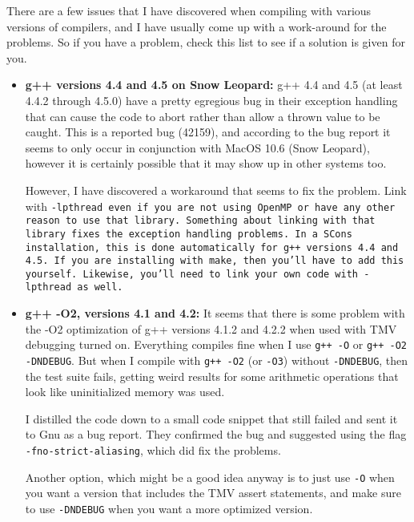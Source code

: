 There are a few issues that I have discovered when compiling with various 
versions of compilers, and I have usually come up with a work-around for
the problems.  So if you have a problem, check this list to see if a solution
is given for you.  

\begin{itemize}
\item {\bf g++ versions 4.4 and 4.5 on Snow Leopard:}
g++ 4.4 and 4.5 (at least 4.4.2 through 4.5.0) have a pretty egregious bug in their exception handling that 
can cause the code to abort rather than allow a thrown value to be caught.  
This is a reported bug (42159), and according to the bug report it seems to only occur in
conjunction with MacOS 10.6 (Snow Leopard), however it is certainly possible that it 
may show up in other systems too. 

However, I have discovered a workaround that seems to fix the problem.  Link with 
\tt{-lpthread} even if you are not using OpenMP or have any other reason to use that
library.  Something about linking with that library fixes the exception handling problems.
In a SCons installation, this is done automatically for g++ versions 4.4 and 4.5.  
If you are installing with make, then you'll have to add this yourself.
Likewise, you'll need to link your own code with \tt{-lpthread} as well.

\item {\bf g++ -O2, versions 4.1 and 4.2:}
It seems that there is some problem with the -O2 optimization of g++ versions 4.1.2 and 4.2.2
when used with TMV debugging turned on.  Everything compiles fine when I use
\texttt{g++ -O} or \texttt{g++ -O2 -DNDEBUG}.  But when I compile with \texttt{g++ -O2} (or \texttt{-O3}) without
\texttt{-DNDEBUG}, then the test suite fails, getting weird results for some arithmetic operations
that look like uninitialized memory was used.  

I distilled the code down to a small code snippet that still failed 
and sent it to Gnu as a bug report.
They confirmed the bug and suggested
using the flag \texttt{-fno-strict-aliasing}, which did fix the problems.

Another option, which might be a good idea anyway is to just use \texttt{-O} 
when you want a version that 
includes the TMV assert statements, and make sure to use \texttt{-DNDEBUG} 
when you want a more optimized version.


\end{itemize}
